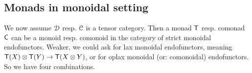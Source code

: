 \documentclass[a4paper, reqno]{amsart}
\theoremstyle{introTheorems}
\renewcommand{\1}{\mathbbold{1}}
\begin{document}
\newcommand{\cotimes}{%
  \begin{tikzpicture}[baseline=(X.base)]
    \node[draw=black, fill=black, circle, inner sep=0.5ex] (X) {};
    \node[text=white, scale=0.8] at (X) {$\times$};
  \end{tikzpicture}%
}

 \subsection{Monads in monoidal setting}\label{subsec:MonoidalMonad}

We now assume $\mathcal{D}$ resp. $\mathcal{C}$ is a tensor category. Then a monad ${\mathsf{T}}$ resp. comonad $\mathsf{C}$ can be a monoid resp. comonoid in the category of strict monoidal endofunctors. Weaker, we could ask for lax monoidal endofunctors, meaning ${\mathsf{T}}(X)\otimes {\mathsf{T}}(Y)\to {\mathsf{T}}(X\otimes Y)$, or for oplax monoidal (or: comonoidal) endofunctors. So we have four combinations. 
\end{document}
